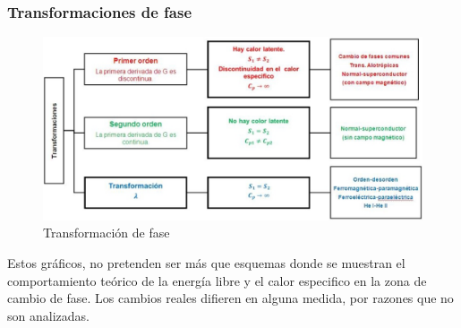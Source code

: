 \subsubsection{Transformaciones de fase}

\begin{figure}[H]
    \centering
    \includegraphics[width=1.0\textwidth]{./Figures/fig428}
	\caption{Transformación de fase}
	\label{fig:428}
\end{figure}

Estos gráficos, no pretenden ser más que esquemas donde se muestran el comportamiento teórico de la energía libre y el calor especifico en la zona de cambio de fase. Los cambios reales difieren en alguna medida, por razones que no son analizadas.

